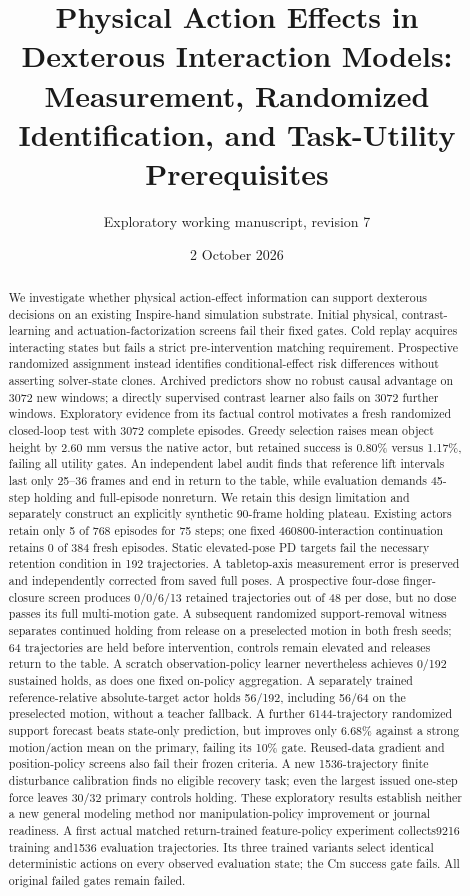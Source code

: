 \documentclass[10 pt]{article}
\title{Physical Action Effects in Dexterous Interaction Models:\\Measurement, Randomized Identification, and Task-Utility Prerequisites}
\author{Exploratory working manuscript, revision 7}
\date{2 October 2026}
\begin{document}
\maketitle
\begin{abstract}
We investigate whether physical action-effect information can support dexterous
decisions on an existing Inspire-hand simulation substrate. Initial physical,
contrast-learning and actuation-factorization screens fail their fixed gates.
Cold replay acquires interacting states but fails a strict pre-intervention
matching requirement. Prospective randomized assignment instead identifies
conditional-effect risk differences without asserting solver-state clones.
Archived predictors show no robust causal advantage on 3072 new windows; a
directly supervised contrast learner also fails on 3072 further windows.
Exploratory evidence from its factual control motivates a fresh randomized
closed-loop test with 3072 complete episodes. Greedy selection raises mean
object height by 2.60 mm versus the native actor, but retained success is
0.80\% versus 1.17\%, failing all utility gates. An independent label audit
finds that reference lift intervals last only 25--36 frames and end in return
to the table, while evaluation demands 45-step holding and full-episode nonreturn.
We retain this design limitation and separately construct an explicitly synthetic
90-frame holding plateau. Existing actors retain only 5 of 768 episodes for
75 steps; one fixed 460800-interaction continuation retains 0 of 384 fresh episodes.
Static elevated-pose PD targets fail the necessary retention condition in 192
trajectories. A tabletop-axis measurement error is preserved and independently
corrected from saved full poses. A prospective four-dose finger-closure screen
produces 0/0/6/13 retained trajectories out of 48 per dose, but no dose passes
its full multi-motion gate. A subsequent randomized support-removal witness separates
continued holding from release on a preselected motion in both fresh seeds;
64 trajectories are held before intervention, controls remain elevated and releases
return to the table. A scratch observation-policy learner nevertheless achieves
0/192 sustained holds, as does one fixed on-policy aggregation. A separately
trained reference-relative absolute-target actor holds 56/192, including 56/64
on the preselected motion, without a teacher fallback. A further 6144-trajectory randomized support forecast beats state-only prediction,
but improves only 6.68\% against a strong motion/action mean on the primary, failing
its 10\% gate. Reused-data gradient and position-policy screens also fail their
frozen criteria. A new 1536-trajectory finite disturbance calibration finds no
eligible recovery task; even the largest issued one-step force leaves 30/32 primary
controls holding. These exploratory results establish neither a new general
modeling method nor manipulation-policy improvement or journal readiness.
A first actual matched return-trained feature-policy experiment collects9216
training and1536 evaluation trajectories. Its three trained variants select
identical deterministic actions on every observed evaluation state; the Cm
success gate fails. All original failed gates remain failed.
\end{abstract}
\end{document}
